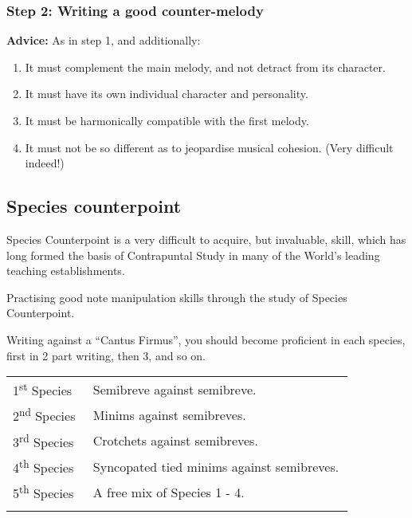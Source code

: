 \documentclass{article}
\begin{document}
\subsubsection{Step 2: Writing a good counter-melody}

\textbf{Advice:}
As in step 1, and additionally:

\begin{enumerate}
    \item It must complement the main melody, and not detract from its character.
    \item It must have its own individual character and personality.
    \item It must be harmonically compatible with the first melody.
    \item It must not be so different as to jeopardise musical cohesion.
        (Very difficult indeed!)
\end{enumerate}

\subsection{Species counterpoint}

Species Counterpoint is a very difficult to acquire, but invaluable, skill, which has long formed the basis of Contrapuntal Study in many of the World’s leading teaching establishments.

Practising good note manipulation skills through the study of Species Counterpoint.

Writing against a ``Cantus Firmus'', you should become proficient in each species, first in 2 part writing, then 3, and so on.

\begin{tabular}{p{0.2\linewidth}p{0.65\linewidth}}
    1\textsuperscript{st} Species & Semibreve against semibreve.\\
    2\textsuperscript{nd} Species & Minims against semibreves.\\
    3\textsuperscript{rd} Species & Crotchets against semibreves.\\
    4\textsuperscript{th} Species & Syncopated tied minims against semibreves.\footnotemark\\
    5\textsuperscript{th} Species & A free mix of Species 1 - 4.\\\\
\end{tabular}

\end{document}
